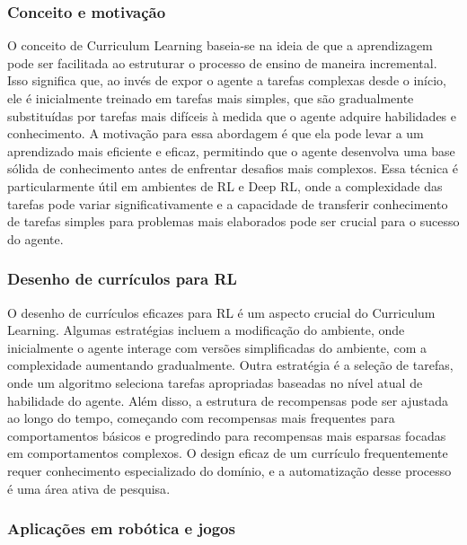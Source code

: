 \subsubsection{Conceito e motivação}
\label{subsubsec:curriculum_conceito}

O conceito de Curriculum Learning baseia-se na ideia de que a aprendizagem pode ser facilitada ao estruturar o processo de ensino de maneira incremental. Isso significa que, ao invés de expor o agente a tarefas complexas desde o início, ele é inicialmente treinado em tarefas mais simples, que são gradualmente substituídas por tarefas mais difíceis à medida que o agente adquire habilidades e conhecimento. A motivação para essa abordagem é que ela pode levar a um aprendizado mais eficiente e eficaz, permitindo que o agente desenvolva uma base sólida de conhecimento antes de enfrentar desafios mais complexos. Essa técnica é particularmente útil em ambientes de RL e Deep RL, onde a complexidade das tarefas pode variar significativamente e a capacidade de transferir conhecimento de tarefas simples para problemas mais elaborados pode ser crucial para o sucesso do agente.

\subsubsection{Desenho de currículos para RL}
\label{subsubsec:curriculum_desenho}

O desenho de currículos eficazes para RL é um aspecto crucial do Curriculum Learning. Algumas estratégias incluem a modificação do ambiente, onde inicialmente o agente interage com versões simplificadas do ambiente, com a complexidade aumentando gradualmente. Outra estratégia é a seleção de tarefas, onde um algoritmo seleciona tarefas apropriadas baseadas no nível atual de habilidade do agente. Além disso, a estrutura de recompensas pode ser ajustada ao longo do tempo, começando com recompensas mais frequentes para comportamentos básicos e progredindo para recompensas mais esparsas focadas em comportamentos complexos. O design eficaz de um currículo frequentemente requer conhecimento especializado do domínio, e a automatização desse processo é uma área ativa de pesquisa\cite{https://www.semanticscholar.org/paper/79d92c9a3e0de40d863e43232e2c00370412a841}.

\subsubsection{Aplicações em robótica e jogos}
\label{subsubsec:curriculum_aplicacoes}

